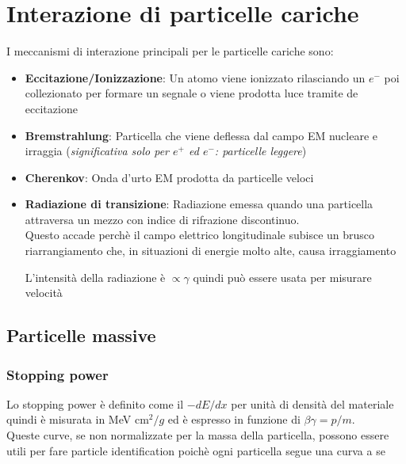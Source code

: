 \section{Interazione di particelle cariche}
I meccanismi di interazione principali per le particelle cariche sono:
\begin{itemize}

    \item \textbf{Eccitazione/Ionizzazione}: Un atomo viene ionizzato rilasciando un $e^-$ poi collezionato per formare un segnale o viene prodotta luce tramite de eccitazione

    \item \textbf{Bremstrahlung}: Particella che viene deflessa dal campo EM nucleare e irraggia (\textit{significativa solo per $e^+$ ed $e^{-}$: particelle leggere})

    \item \textbf{Cherenkov}: Onda d'urto EM prodotta da particelle veloci

    \item \textbf{Radiazione di transizione}: Radiazione emessa quando una particella attraversa un mezzo con indice di rifrazione discontinuo. \\
    Questo accade perchè il campo elettrico longitudinale subisce un brusco riarrangiamento che, in situazioni di energie molto alte, causa irraggiamento

    L'intensità della radiazione è $\propto \gamma$ quindi può essere usata per misurare velocità

\end{itemize}
\subsection{Particelle massive}
    \subsubsection*{Stopping power}
        Lo stopping power è definito come il $-dE/dx$ per unità di densità del materiale quindi è misurata in MeV cm$^2/g$  ed è espresso in funzione di $\beta \gamma=p/m$.
        \\
        Queste curve, se non normalizzate per la massa della particella, possono essere utili per fare particle identification poichè ogni particella segue una curva a se

